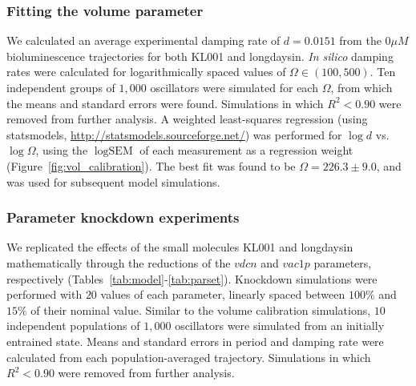 \documentclass[11pt, letterpaper]{article}
\begin{document}
\subsubsection*{Fitting the volume parameter}
We calculated an average experimental damping rate of $d = 0.0151$ from the $0 \mu M$ bioluminescence trajectories for both KL001 and longdaysin.
{\itshape In silico} damping rates were calculated for logarithmically spaced values of $\Omega \in (100, 500)$.
Ten independent groups of $1,000$ oscillators were simulated for each $\Omega$, from which the means and standard errors were found.
Simulations in which $R^2 < 0.90$ were removed from further analysis.
A weighted least-squares regression (using statsmodels, \url{http://statsmodels.sourceforge.net/}) was performed for $\log d$ vs.\ $\log \Omega$, using the $\log \text{SEM}$ of each measurement as a regression weight (Figure~\ref{fig:vol_calibration}).
The best fit was found to be $\Omega = 226.3 \pm 9.0$, and was used for subsequent model simulations.

\subsubsection*{Parameter knockdown experiments}
We replicated the effects of the small molecules KL001 and longdaysin mathematically through the reductions of the $vdcn$ and $vac1p$ parameters, respectively (Tables~\ref{tab:model}-\ref{tab:parset}).
Knockdown simulations were performed with $20$ values of each parameter, linearly spaced between $100\%$ and $15\%$ of their nominal value.
Similar to the volume calibration simulations, $10$ independent populations of $1,000$ oscillators were simulated from an initially entrained state.
Means and standard errors in period and damping rate were calculated from each population-averaged trajectory.
Simulations in which $R^2 < 0.90$ were removed from further analysis.
\end{document}
